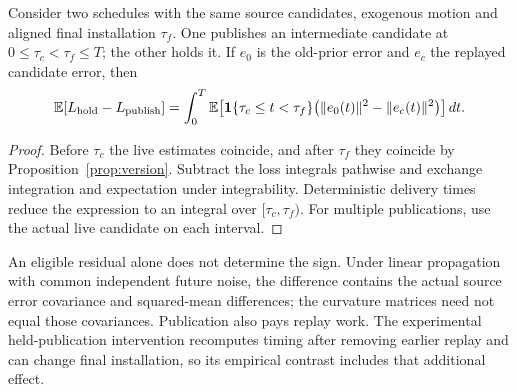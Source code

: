 \begin{proposition}\label{prop:exposure}
Consider two schedules with the same source candidates, exogenous motion and aligned final installation $\tau_f$. One publishes an intermediate candidate at $0\le\tau_c<\tau_f\le T$; the other holds it. If $e_0$ is the old-prior error and $e_c$ the replayed candidate error, then
\begin{equation}
\mathbb E[L_{\rm hold}-L_{\rm publish}]
=\int_0^T\mathbb E\!\left[\mathbf 1\{\tau_c\le t<\tau_f\}\big(\|e_0(t)\|^2-\|e_c(t)\|^2\big)\right]dt.\label{eq:exposure}
\end{equation}
\end{proposition}
\begin{proof}
Before $\tau_c$ the live estimates coincide, and after $\tau_f$ they coincide by Proposition~\ref{prop:version}. Subtract the loss integrals pathwise and exchange integration and expectation under integrability. Deterministic delivery times reduce the expression to an integral over $[\tau_c,\tau_f)$. For multiple publications, use the actual live candidate on each interval.
\end{proof}
An eligible residual alone does not determine the sign. Under linear propagation with common independent future noise, the difference contains the actual source error covariance and squared-mean differences; the curvature matrices need not equal those covariances. Publication also pays replay work. The experimental held-publication intervention recomputes timing after removing earlier replay and can change final installation, so its empirical contrast includes that additional effect.

